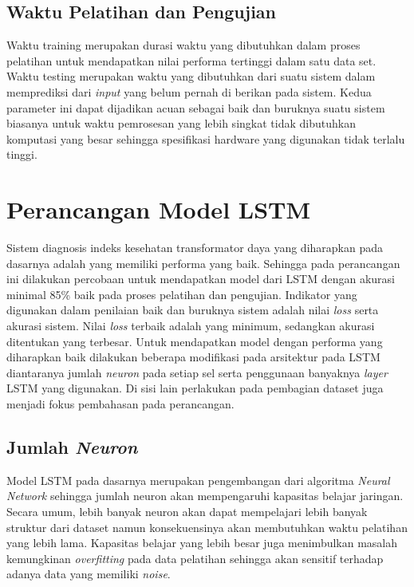 \subsection{Waktu Pelatihan dan Pengujian}
Waktu training merupakan durasi waktu yang dibutuhkan dalam proses pelatihan untuk mendapatkan nilai performa tertinggi dalam satu data set. Waktu testing merupakan waktu yang dibutuhkan dari suatu sistem dalam memprediksi dari \textit{input} yang belum pernah di berikan pada sistem. Kedua parameter ini dapat dijadikan acuan sebagai baik dan buruknya suatu sistem biasanya untuk waktu pemrosesan  yang lebih singkat tidak dibutuhkan komputasi yang besar sehingga spesifikasi hardware yang digunakan tidak terlalu tinggi.

\section{Perancangan Model LSTM}

Sistem diagnosis indeks kesehatan transformator daya yang diharapkan pada dasarnya adalah yang memiliki performa yang baik. Sehingga pada perancangan ini dilakukan percobaan untuk mendapatkan model dari LSTM dengan akurasi minimal 85\% baik pada proses pelatihan dan pengujian. Indikator yang digunakan dalam penilaian baik dan buruknya sistem adalah nilai \textit{loss} serta akurasi sistem. Nilai \textit{loss} terbaik adalah yang minimum, sedangkan akurasi ditentukan yang terbesar. Untuk mendapatkan model dengan performa yang diharapkan baik dilakukan beberapa modifikasi pada arsitektur pada LSTM diantaranya jumlah \textit{neuron} pada setiap sel serta penggunaan banyaknya \textit{layer} LSTM yang digunakan. Di sisi lain perlakukan pada pembagian dataset juga menjadi fokus pembahasan pada perancangan.

\subsection{Jumlah \textit{Neuron}}
Model LSTM pada dasarnya merupakan pengembangan dari algoritma \textit{Neural Network} sehingga jumlah neuron akan mempengaruhi kapasitas belajar jaringan. Secara umum, lebih banyak neuron akan dapat mempelajari lebih banyak struktur dari dataset namun konsekuensinya akan membutuhkan waktu pelatihan yang lebih lama. Kapasitas belajar yang lebih besar juga menimbulkan masalah kemungkinan \textit{overfitting} pada data pelatihan sehingga akan sensitif terhadap adanya data yang memiliki \textit{noise}.

